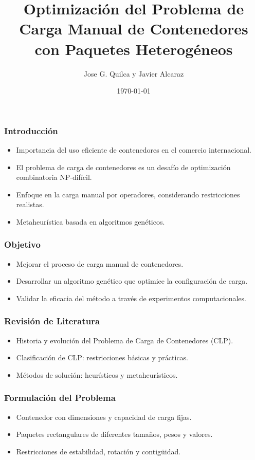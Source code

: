 \documentclass{beamer}
\title{Optimización del Problema de Carga Manual de Contenedores con Paquetes Heterogéneos}
\author{Jose G. Quilca y Javier Alcaraz}
\institute{Centro de Investigación Operativa, Universidad Miguel Hernández}
\date{\today}
\begin{document}
\frame{\titlepage}

\begin{frame}
    \frametitle{Introducción}
    \begin{itemize}
        \item Importancia del uso eficiente de contenedores en el comercio internacional.
        \item El problema de carga de contenedores es un desafío de optimización combinatoria NP-difícil.
        \item Enfoque en la carga manual por operadores, considerando restricciones realistas.
        \item Metaheurística basada en algoritmos genéticos.
    \end{itemize}
\end{frame}

\begin{frame}
    \frametitle{Objetivo}
    \begin{itemize}
        \item Mejorar el proceso de carga manual de contenedores.
        \item Desarrollar un algoritmo genético que optimice la configuración de carga.
        \item Validar la eficacia del método a través de experimentos computacionales.
    \end{itemize}
\end{frame}

\begin{frame}
    \frametitle{Revisión de Literatura}
    \begin{itemize}
        \item Historia y evolución del Problema de Carga de Contenedores (CLP).
        \item Clasificación de CLP: restricciones básicas y prácticas.
        \item Métodos de solución: heurísticos y metaheurísticos.
    \end{itemize}
\end{frame}

\begin{frame}
    \frametitle{Formulación del Problema}
    \begin{itemize}
        \item Contenedor con dimensiones y capacidad de carga fijas.
        \item Paquetes rectangulares de diferentes tamaños, pesos y valores.
        \item Restricciones de estabilidad, rotación y contigüidad.
    \end{itemize}
\end{frame}
\end{document}
